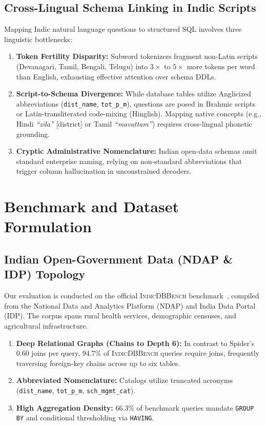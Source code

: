 \documentclass[conference]{IEEEtran}
\begin{document}
\subsection{Cross-Lingual Schema Linking in Indic Scripts}
Mapping Indic natural language questions to structured SQL involves three linguistic bottlenecks:
\begin{enumerate}
    \item \textbf{Token Fertility Disparity:} Subword tokenizers fragment non-Latin scripts (Devanagari, Tamil, Bengali, Telugu) into $3\times$ to $5\times$ more tokens per word than English, exhausting effective attention over schema DDLs.
    \item \textbf{Script-to-Schema Divergence:} While database tables utilize Anglicized abbreviations (\texttt{dist\_name}, \texttt{tot\_p\_m}), questions are posed in Brahmic scripts or Latin-transliterated code-mixing (Hinglish). Mapping native concepts (e.g., Hindi \emph{``zila''} [district] or Tamil \emph{``mavattam''}) requires cross-lingual phonetic grounding.
    \item \textbf{Cryptic Administrative Nomenclature:} Indian open-data schemas omit standard enterprise naming, relying on non-standard abbreviations that trigger column hallucination in unconstrained decoders.
\end{enumerate}

\section{Benchmark and Dataset Formulation}\label{sec:dataset}

\subsection{Indian Open-Government Data (NDAP \& IDP) Topology}
Our evaluation is conducted on the official \textsc{IndicDBBench} benchmark~\cite{dawar2026indicdbbench}, compiled from the National Data and Analytics Platform (NDAP) and India Data Portal (IDP). The corpus spans rural health services, demographic censuses, and agricultural infrastructure.

\begin{enumerate}
    \item \textbf{Deep Relational Graphs (Chains to Depth 6):} In contrast to Spider's 0.60 joins per query, 94.7\% of \textsc{IndicDBBench} queries require joins, frequently traversing foreign-key chains across up to six tables.
    \item \textbf{Abbreviated Nomenclature:} Catalogs utilize truncated acronyms (\texttt{dist\_name}, \texttt{tot\_p\_m}, \texttt{sch\_mgmt\_cat}).
    \item \textbf{High Aggregation Density:} 66.3\% of benchmark queries mandate \texttt{GROUP BY} and conditional thresholding via \texttt{HAVING}.
\end{enumerate}
\end{document}
